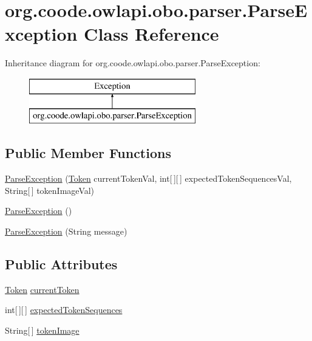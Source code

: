 \hypertarget{classorg_1_1coode_1_1owlapi_1_1obo_1_1parser_1_1_parse_exception}{\section{org.\-coode.\-owlapi.\-obo.\-parser.\-Parse\-Exception Class Reference}
\label{classorg_1_1coode_1_1owlapi_1_1obo_1_1parser_1_1_parse_exception}
}
Inheritance diagram for org.\-coode.\-owlapi.\-obo.\-parser.\-Parse\-Exception\-:\begin{figure}[H]
\begin{center}
\leavevmode
\includegraphics[height=2.000000cm]{classorg_1_1coode_1_1owlapi_1_1obo_1_1parser_1_1_parse_exception}
\end{center}
\end{figure}
\subsection*{Public Member Functions}
\begin{DoxyCompactItemize}
\item 
\hyperlink{classorg_1_1coode_1_1owlapi_1_1obo_1_1parser_1_1_parse_exception_ab3859165687f07cbfbc16cae07a1e063}{Parse\-Exception} (\hyperlink{classorg_1_1coode_1_1owlapi_1_1obo_1_1parser_1_1_token}{Token} current\-Token\-Val, int\mbox{[}$\,$\mbox{]}\mbox{[}$\,$\mbox{]} expected\-Token\-Sequences\-Val, String\mbox{[}$\,$\mbox{]} token\-Image\-Val)
\item 
\hyperlink{classorg_1_1coode_1_1owlapi_1_1obo_1_1parser_1_1_parse_exception_a471d3af147e7af3edeebc5da72621af0}{Parse\-Exception} ()
\item 
\hyperlink{classorg_1_1coode_1_1owlapi_1_1obo_1_1parser_1_1_parse_exception_a2133d95c60d767c6ce4168866cb11b0b}{Parse\-Exception} (String message)
\end{DoxyCompactItemize}
\subsection*{Public Attributes}
\begin{DoxyCompactItemize}
\item 
\hyperlink{classorg_1_1coode_1_1owlapi_1_1obo_1_1parser_1_1_token}{Token} \hyperlink{classorg_1_1coode_1_1owlapi_1_1obo_1_1parser_1_1_parse_exception_add3559d1841b498d3221cb05da884ca1}{current\-Token}
\item 
int\mbox{[}$\,$\mbox{]}\mbox{[}$\,$\mbox{]} \hyperlink{classorg_1_1coode_1_1owlapi_1_1obo_1_1parser_1_1_parse_exception_ae38b20926a6bf23a1f699a71a405b290}{expected\-Token\-Sequences}
\item 
String\mbox{[}$\,$\mbox{]} \hyperlink{classorg_1_1coode_1_1owlapi_1_1obo_1_1parser_1_1_parse_exception_a5225490b27f6841ebc077a8a08712304}{token\-Image}
\end{DoxyCompactItemize}

